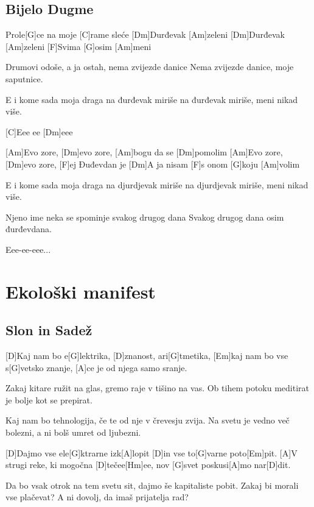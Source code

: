 \documentclass[a4paper,12pt]{article}
\begin{document}
\begin{multicols}{2}
\subsection*{Bijelo Dugme}
\begin{guitar}
[Am]Prole[G]ce na moje [C]rame sleće 
[Dm]Durđevak [Am]zeleni 
[Dm]Durđevak [Am]zeleni
[F]Svima [G]osim [Am]meni


Drumovi odoše, a ja ostah, 
nema zvijezde danice
Nema zvijezde danice, 
moje saputnice.


E i kome sada moja draga 
na đurđevak miriše
na đurđevak miriše, 
meni nikad više.


[C]Eee ee [Dm]eee 

[Am]Evo zore, [Dm]evo zore, [Am]bogu da se [Dm]pomolim 
[Am]Evo zore, [Dm]evo zore, [F]ej Đuđevdan je 
[Dm]A ja nisam [F]s onom [G]koju [Am]volim   


E i kome sada moja draga 
na djurdjevak miriše
na djurdjevak miriše, 
meni nikad više.


Njeno ime neka se spominje 
svakog drugog dana
Svakog drugog dana 
osim đurđevdana.

         
Eee-ee-eee...

\end{guitar}
\section{Ekološki manifest}
\subsection*{Slon in Sadež}
\begin{guitar}
[D G D G Em G A] 


[D]Kaj nam bo e[G]lektrika, 
[D]znanost, ari[G]tmetika, 
[Em]kaj nam bo vse s[G]vetsko znanje, 
[A]ce je od njega samo sranje. 


Zakaj kitare ružit na glas, 
gremo raje v tišino na vas. 
Ob tihem potoku meditirat 
je bolje kot se prepirat. 
   
   
Kaj nam bo tehnologija,      
če te od nje v črevesju zvija. 
Na svetu je vedno več bolezni, 
a ni bolš umret od ljubezni. 


[D]Dajmo vse ele[G]ktrarne izk[A]lopit 
[D]in vse to[G]varne poto[Em]pit. 
[A]V strugi reke, ki mogočna [D]tečee[Hm]ee, 
nov [G]svet poskusi[A]mo nar[D]dit. 


Da bo vsak otrok na tem svetu sit, 
dajmo še kapitaliste pobit. 
Zakaj bi morali vse plačevat?
A ni dovolj, da imaš prijatelja rad?  



\end{guitar}
\end{multicols}
\end{document}
